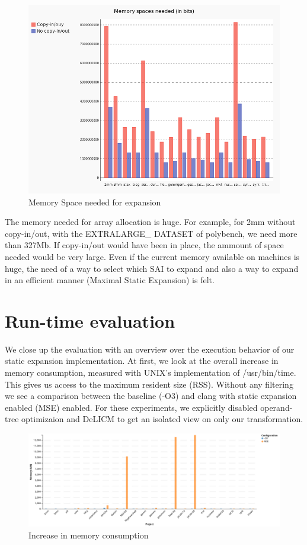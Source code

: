 \begin{figure}
\centering
\includegraphics[scale=0.4]{gfx/Evaluation/MemorySpace.png}
\caption{Memory Space needed for expansion}
\label{fig:MemorySpace}
\end{figure}

The memory needed for array allocation is huge. For example, for 2mm without copy-in/out, with the EXTRALARGE\_ DATASET of polybench, we need more than 327Mb. If copy-in/out would have been in place, the ammount of space needed would be very large. Even if the current memory available on machines is huge, the need of a way to select which SAI to expand and also a way to expand in an efficient manner (Maximal Static Expansion) is felt.

\section{Run-time evaluation}
We close up the evaluation with an overview over the execution behavior of our static expansion implementation. At first, we look at the overall increase in memory consumption, measured with UNIX’s implementation of /usr/bin/time. This gives us access to the maximum resident size (RSS). Without any filtering we see a comparison between the baseline (-O3) and clang with static expansion enabled (MSE) enabled. For these experiments, we explicitly disabled operand-tree optimizaion and DeLICM to get an isolated view on only our transformation.

\begin{figure}
\centering
\includegraphics[angle=90,origin=c,scale=0.5]{gfx/Evaluation/RT-1.png}
\caption{Increase in memory consumption}
\label{fig:RT-1}
\end{figure}

